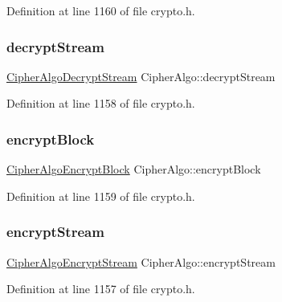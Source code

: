 Definition at line 1160 of file crypto.\+h.

\mbox{\label{structCipherAlgo_a20a406bd117ecab1e3b5a9d23f5deee2}} 
\subsubsection{\texorpdfstring{decrypt\+Stream}{decryptStream}}
{\footnotesize\ttfamily \hyperlink{cyclone__crypto_2core_2crypto_8h_aafba7bbaaf58a20e4766a30f2d14fc7f}{Cipher\+Algo\+Decrypt\+Stream} Cipher\+Algo\+::decrypt\+Stream}



Definition at line 1158 of file crypto.\+h.

\mbox{\label{structCipherAlgo_a61360848127c17c27fe5304588f7f211}} 
\subsubsection{\texorpdfstring{encrypt\+Block}{encryptBlock}}
{\footnotesize\ttfamily \hyperlink{cyclone__crypto_2core_2crypto_8h_a4b511302b7e4f6ff51dd72f5abde7077}{Cipher\+Algo\+Encrypt\+Block} Cipher\+Algo\+::encrypt\+Block}



Definition at line 1159 of file crypto.\+h.

\mbox{\label{structCipherAlgo_a158602146ec9ac4f5eb3540e603b0a44}} 
\subsubsection{\texorpdfstring{encrypt\+Stream}{encryptStream}}
{\footnotesize\ttfamily \hyperlink{cyclone__crypto_2core_2crypto_8h_aae77a823e0d715f38ce07aa1966dd8f5}{Cipher\+Algo\+Encrypt\+Stream} Cipher\+Algo\+::encrypt\+Stream}



Definition at line 1157 of file crypto.\+h.

\mbox{\label{structCipherAlgo_a5c1fa3eb89f3d31f01c2c501b94fdd79}} 
